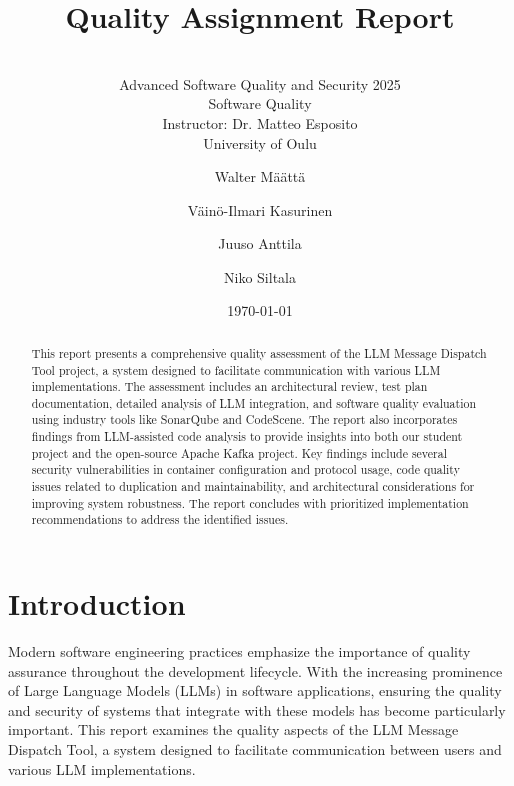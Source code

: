 \documentclass[sigconf]{acmart}
\begin{document}
\title{Quality Assignment Report}
\subtitle{\\[0.5cm] Advanced Software Quality and Security 2025 \\ Software Quality \\ Instructor: Dr. Matteo Esposito \\ University of Oulu}

\author{Walter Määttä}

\author{Väinö-Ilmari Kasurinen}

\author{Juuso Anttila}

\author{Niko Siltala}

\date{\today}


\begin{abstract}
This report presents a comprehensive quality assessment of the LLM Message Dispatch Tool project, a system designed to facilitate communication with various LLM implementations. The assessment includes an architectural review, test plan documentation, detailed analysis of LLM integration, and software quality evaluation using industry tools like SonarQube and CodeScene. The report also incorporates findings from LLM-assisted code analysis to provide insights into both our student project and the open-source Apache Kafka project. Key findings include several security vulnerabilities in container configuration and protocol usage, code quality issues related to duplication and maintainability, and architectural considerations for improving system robustness. The report concludes with prioritized implementation recommendations to address the identified issues.
\end{abstract}

\maketitle

\section{Introduction}
Modern software engineering practices emphasize the importance of quality assurance throughout the development lifecycle. With the increasing prominence of Large Language Models (LLMs) in software applications, ensuring the quality and security of systems that integrate with these models has become particularly important. This report examines the quality aspects of the LLM Message Dispatch Tool, a system designed to facilitate communication between users and various LLM implementations.
\end{document}
